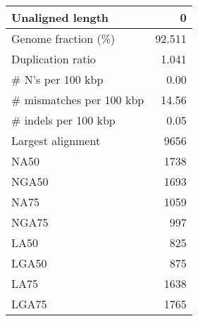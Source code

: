 \documentclass[12pt,a4paper]{article}
\begin{document}
\begin{table}[ht]
\begin{center}
\begin{tabular}{|l*{1}{|r}|}
Unaligned length & 0 \\ \hline
Genome fraction (\%) & 92.511 \\ \hline
Duplication ratio & 1.041 \\ \hline
\# N's per 100 kbp & 0.00 \\ \hline
\# mismatches per 100 kbp & 14.56 \\ \hline
\# indels per 100 kbp & 0.05 \\ \hline
Largest alignment & 9656 \\ \hline
NA50 & 1738 \\ \hline
NGA50 & 1693 \\ \hline
NA75 & 1059 \\ \hline
NGA75 & 997 \\ \hline
LA50 & 825 \\ \hline
LGA50 & 875 \\ \hline
LA75 & 1638 \\ \hline
LGA75 & 1765 \\ \hline
\end{tabular}
\end{center}
\end{table}
\end{document}
